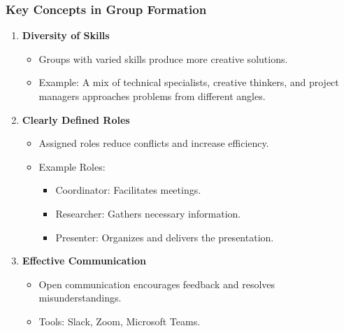 \documentclass[aspectratio=169]{beamer}
\begin{document}
\begin{frame}[fragile]
    \frametitle{Key Concepts in Group Formation}
    \begin{enumerate}
        \item \textbf{Diversity of Skills} 
        \begin{itemize}
            \item Groups with varied skills produce more creative solutions. 
            \item Example: A mix of technical specialists, creative thinkers, and project managers approaches problems from different angles.
        \end{itemize}
        
        \item \textbf{Clearly Defined Roles} 
        \begin{itemize}
            \item Assigned roles reduce conflicts and increase efficiency.
            \item Example Roles:
                \begin{itemize}
                    \item Coordinator: Facilitates meetings.
                    \item Researcher: Gathers necessary information.
                    \item Presenter: Organizes and delivers the presentation.
                \end{itemize}    
        \end{itemize}

        \item \textbf{Effective Communication} 
        \begin{itemize}
            \item Open communication encourages feedback and resolves misunderstandings.
            \item Tools: Slack, Zoom, Microsoft Teams.
        \end{itemize}
    \end{enumerate}
\end{frame}
\end{document}
